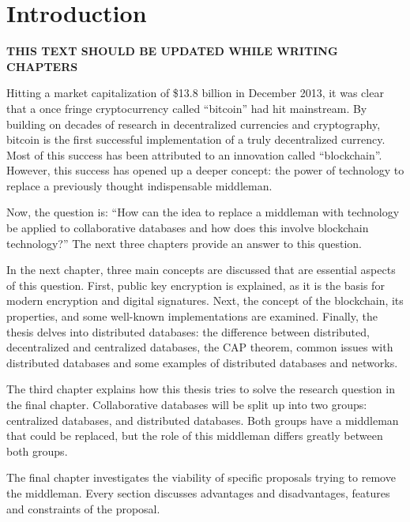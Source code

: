 \chapter{Introduction}

\textbf{THIS TEXT SHOULD BE UPDATED WHILE WRITING CHAPTERS}


Hitting a market capitalization of \$13.8 billion in December 2013, it was clear that a once fringe cryptocurrency called ``bitcoin'' had hit mainstream. By building on decades of research in decentralized currencies and cryptography, bitcoin is the first successful implementation of a truly decentralized currency. Most of this success has been attributed to an innovation called ``blockchain''. However, this success has opened up a deeper concept: the power of technology to replace a previously thought indispensable middleman.


Now, the question is: ``How can the idea to replace a middleman with technology be applied to collaborative databases and how does this involve blockchain technology?'' The next three chapters provide an answer to this question.


In the next chapter, three main concepts are discussed that are essential aspects of this question. First, public key encryption is explained, as it is the basis for modern encryption and digital signatures. Next, the concept of the blockchain, its properties, and some well-known implementations are examined. Finally, the thesis delves into distributed databases: the difference between distributed, decentralized and centralized databases, the CAP theorem, common issues with distributed databases and some examples of distributed databases and networks.

The third chapter explains how this thesis tries to solve the research question in the final chapter. Collaborative databases will be split up into two groups: centralized databases, and distributed databases. Both groups have a middleman that could be replaced, but the role of this middleman differs greatly between both groups. 

The final chapter investigates the viability of specific proposals trying to remove the middleman. Every section discusses advantages and disadvantages, features and constraints of the proposal.
